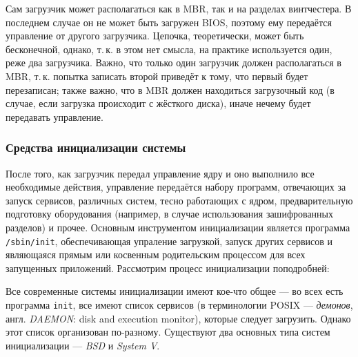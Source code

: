   Сам загрузчик может располагаться как в MBR, так и на разделах винтчестера. В последнем случае он не может быть загружен BIOS, поэтому ему передаётся управление от другого загрузчика. Цепочка, теоретически, может быть бесконечной, однако, т.\,к. в этом нет смысла, на практике используется один, реже два загрузчика. Важно, что только один загрузчик должен располагаться в MBR, т.\,к. попытка записать второй приведёт к тому, что первый будет перезаписан;
  также важно, что в MBR должен находиться загрузочный код (в случае, если загрузка происходит с жёсткого диска), иначе нечему будет передавать управление.
  
 \subsubsection{Средства инициализации системы}\label{base:os:structure:bootandinit:init}
 После того, как загрузчик передал управление ядру и оно выполнило все необходимые действия, управление передаётся набору программ, отвечающих за запуск сервисов, различных систем, тесно работающих с ядром, предварительную подготовку оборудования (например, в случае использования зашифрованных разделов) и прочее.
 Основным инструментом инициализации является программа \texttt{/sbin/init}, обеспечивающая упраление загрузкой, запуск других сервисов и являющаяся прямым или косвенным родительским процессом для всех запущенных приложений. Рассмотрим процесс инициализации поподробней:
  
 Все современные системы инициализации имеют кое-что общее --- во всех есть программа \texttt{init}, все имеют список сервисов (в терминологии POSIX --- \emph{демонов}, англ. \emph{DAEMON}: disk and execution monitor), которые следует загрузить. Однако этот список организован по-разному. Существуют два основных типа систем инициализации --- \emph{BSD} и \emph{System V}.
  
